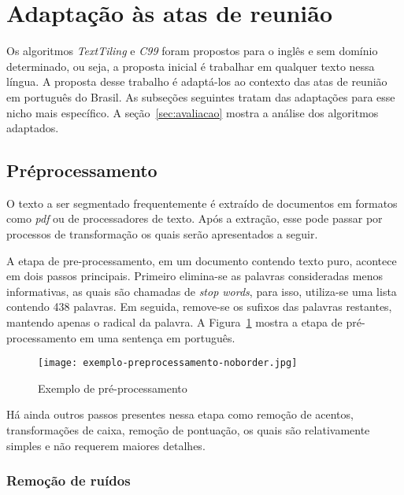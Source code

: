 \section{Adaptação às atas de reunião}
	\label{sec:adaptacaoasatas}



	Os algoritmos \textit{TextTiling} e \textit{C99} foram propostos para o inglês e sem domínio determinado, ou seja, a proposta inicial é trabalhar em qualquer texto nessa língua.
	A proposta desse trabalho é adaptá-los ao contexto das atas de reunião em português do Brasil. As subseções seguintes tratam das adaptações para esse nicho mais específico. A seção~\ref{sec:avaliacao} mostra a análise dos algoritmos adaptados.



\subsection{Préprocessamento}
	\label{subsec:preprocessamento}




	O texto a ser segmentado frequentemente é extraído de documentos em formatos como \textit{pdf} ou de processadores de texto. Após a extração, esse pode passar por processos de transformação os quais serão apresentados a seguir.

	A etapa de pre-processamento, em um documento contendo texto puro, acontece em dois passos principais. Primeiro elimina-se as palavras consideradas menos informativas, as quais são chamadas de \textit{stop words}, para isso, utiliza-se uma lista contendo 438 palavras. Em seguida, remove-se os sufixos das palavras restantes, mantendo apenas o radical da palavra. A Figura~\ref{fig:exemplopreprocessamento} mostra a etapa de pré-processamento em uma sentença em português.
	



  \begin{figure}[!h]
	\centering
	\texttt{[image: exemplo-preprocessamento-noborder.jpg]}
	\caption{Exemplo de pré-processamento}
	\label{fig:exemplopreprocessamento}
  \end{figure}


Há ainda outros passos presentes nessa etapa como remoção de acentos, transformações de caixa, remoção de pontuação, os quais são relativamente simples e não requerem maiores detalhes.





\subsubsection{Remoção de ruídos}

